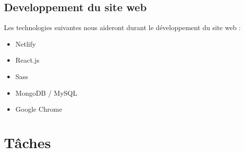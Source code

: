 \documentclass{article}
\begin{document}
\subsection{Developpement du site web}
Les technologies suivantes nous aideront durant le développement du site web :
\begin{itemize}
    \item Netlify
    \item React.js
    \item Sass
    \item MongoDB / MySQL
    \item Google Chrome
\end{itemize}

\setlength{\tabcolsep}{8pt}
\renewcommand{\arraystretch}{1.3}

\section{Tâches}
\end{document}
